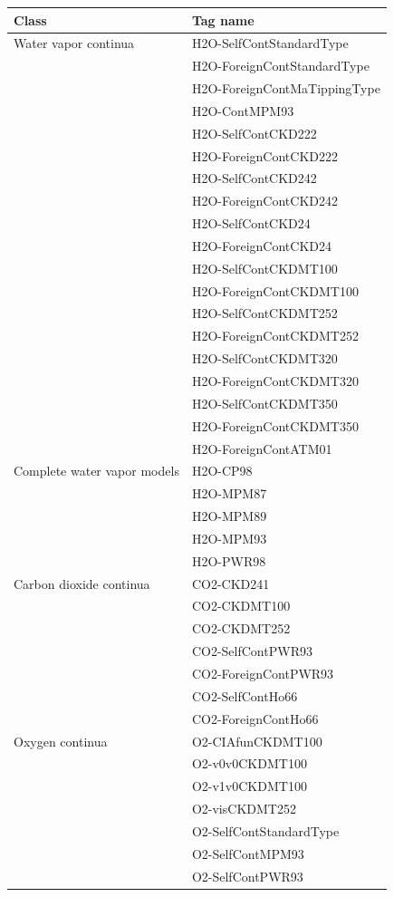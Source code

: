 \begin{table}
\centering
\footnotesize
\begin{tabular}{ll}
\hline  
Class & Tag name \\
\hline  

Water vapor continua
& H2O-SelfContStandardType \\
& H2O-ForeignContStandardType \\
& H2O-ForeignContMaTippingType \\
& H2O-ContMPM93 \\
& H2O-SelfContCKD222 \\
& H2O-ForeignContCKD222 \\
& H2O-SelfContCKD242 \\
& H2O-ForeignContCKD242 \\
& H2O-SelfContCKD24 \\
& H2O-ForeignContCKD24 \\
& H2O-SelfContCKDMT100 \\
& H2O-ForeignContCKDMT100 \\
& H2O-SelfContCKDMT252 \\
& H2O-ForeignContCKDMT252 \\
& H2O-SelfContCKDMT320 \\
& H2O-ForeignContCKDMT320 \\
& H2O-SelfContCKDMT350 \\
& H2O-ForeignContCKDMT350 \\
& H2O-ForeignContATM01 \\[1ex]

Complete water vapor models
& H2O-CP98 \\
& H2O-MPM87 \\
& H2O-MPM89 \\
& H2O-MPM93 \\
& H2O-PWR98 \\[1ex]

Carbon dioxide continua 
& CO2-CKD241 \\
& CO2-CKDMT100 \\
& CO2-CKDMT252 \\
& CO2-SelfContPWR93 \\
& CO2-ForeignContPWR93 \\
& CO2-SelfContHo66 \\
& CO2-ForeignContHo66 \\[1ex]

Oxygen continua 
& O2-CIAfunCKDMT100 \\
& O2-v0v0CKDMT100 \\
& O2-v1v0CKDMT100 \\
& O2-visCKDMT252 \\
& O2-SelfContStandardType \\
& O2-SelfContMPM93 \\
& O2-SelfContPWR93 \\[1ex]


\end{tabular}
\end{table}
